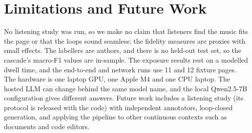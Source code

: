 \documentclass[conference]{IEEEtran}
\begin{document}
\section{Limitations and Future Work}
\label{sec:limitations}

No listening study was run, so we make no claim that listeners find the music fits
the page or that the loops sound seamless; the fidelity measures are proxies with
small effects. The labellers are authors, and there is no held-out test set, so the
cascade's macro-F1 values are in-sample. The exposure results rest on a modelled
dwell time, and the end-to-end and network runs use 11 and 12 fixture pages. The
hardware is one laptop GPU, one Apple M4 and one CPU laptop. The hosted LLM can
change behind the same model name, and the local Qwen2.5-7B configuration gives
different answers. Future work includes a listening study (its protocol is released
with the code) with independent annotators, loop-closed generation, and applying
the pipeline to other continuous contexts such as documents and code editors.
\end{document}
